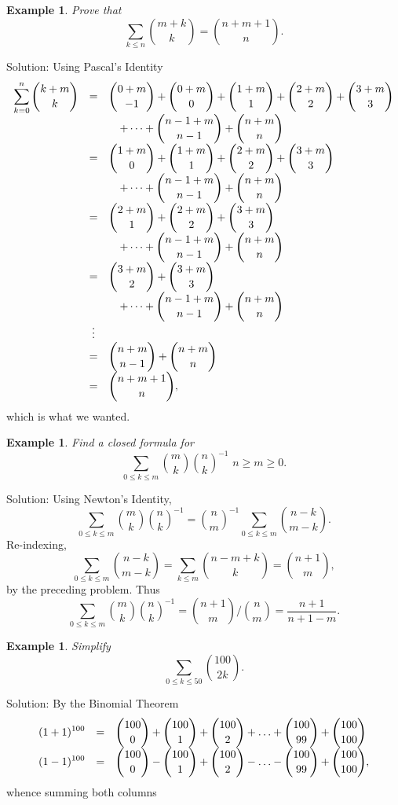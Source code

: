 \documentclass[11pt, openany]{book}
\theoremstyle{change} \theoremheaderfont{\blue\sffamily\bfseries}
\newtheorem{exa}[thm]{Example}
\theoremstyle{nonumberplain} \theoremheaderfont{\sffamily\bfseries}
\def\binom#1#2{{#1\choose#2}}
\newcommand{\í}{\'{\i}}
\begin{document}
\begin{exa} Prove that
$$\sum _{k \leq n} \binom{m + k}{k} = \binom{n + m + 1}{n}.$$ \end{exa}
Solution: Using Pascal's Identity
$$ {\everymath{\displaystyle}\begin{array}{lcl}
\sum _{k = 0} ^n \binom{k + m}{k} & = &
\binom{0 + m }{-1} + \binom{0 + m}{0} + \binom{1 + m}{1} + \binom{2 + m}{2}  + \binom{3 + m}{3} \\
& & \quad + \cdots + \binom{n - 1 + m}{n - 1} + \binom{n + m}{n} \\
& = & \binom{1 + m}{0} + \binom{1 + m}{1} + \binom{2 + m}{2}  + \binom{3 + m}{3} \\
& & \quad + \cdots + \binom{n - 1 + m}{n - 1} + \binom{n + m}{n} \\
& = & \binom{2 + m}{1} + \binom{2 + m}{2}  + \binom{3 + m}{3} \\
& & \quad + \cdots + \binom{n - 1 + m}{n - 1} + \binom{n + m}{n} \\
& = & \binom{3 + m}{2} + \binom{3 + m}{3} \\
& & \quad + \cdots + \binom{n - 1 + m}{n - 1} + \binom{n + m}{n} \\
& \vdots & \\
& = & \binom{n + m}{n - 1}  + \binom{n + m}{n} \\
& = & \binom{n + m + 1}{n},
\end{array}}$$which is what we wanted.
\begin{exa} Find a closed formula for $$ \sum _{0 \leq k \leq m}
\binom{m}{k}\binom{n}{k} ^{-1}\,\, n \geq m \geq 0. $$ \end{exa}
Solution: Using Newton's Identity,
$$   \sum _{0 \leq k \leq m}
\binom{m}{k}\binom{n}{k} ^{-1}   =  \binom{n}{m}^{-1}\sum  _{0
\leq k \leq m} \binom{n - k}{m - k} .$$ Re-indexing,
$$\sum  _{0 \leq k \leq m} \binom{n - k}{m - k}  = \sum _{k \leq m} \binom{n - m + k}{k} = \binom{n + 1}{m},$$
by the preceding problem. Thus
$$\sum _{0 \leq k \leq m}
\binom{m}{k}\binom{n}{k} ^{-1} = \binom{n + 1}{m}/\binom{n}{m} =
\frac{n + 1}{n + 1 - m}.$$
\begin{exa} Simplify $$ \sum _{0 \leq k
\leq 50} \binom{100}{2k}.$$ \end{exa} Solution: By the Binomial
Theorem
$$ {\everymath{\displaystyle}\begin{array}{lcl}(1 + 1)^{100} & = & \binom{100}{0} + \binom{100}{1} + \binom{100}{2} +  \ldots + \binom{100}{99} + \binom{100}{100} \\
(1 - 1)^{100} & = & \binom{100}{0} - \binom{100}{1} +
\binom{100}{2} -  \ldots - \binom{100}{99} + \binom{100}{100},
\end{array}}$$whence summing both columns
\end{document}
